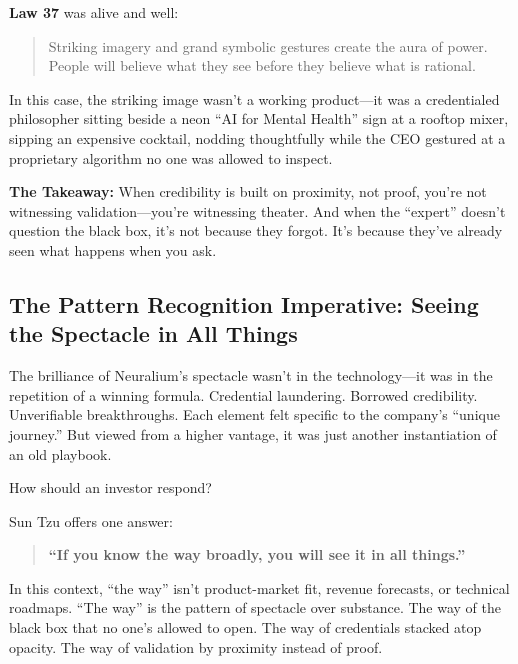 \medskip

\textbf{Law 37} was alive and well:

\begin{quote}
Striking imagery and grand symbolic gestures create the aura of power. People will believe what they see before they believe what is rational.
\end{quote}

In this case, the striking image wasn’t a working product—it was a credentialed philosopher sitting beside a neon ``AI for Mental Health'' sign at a rooftop mixer, sipping an expensive cocktail, nodding thoughtfully while the CEO gestured at a proprietary algorithm no one was allowed to inspect.

\medskip

\textbf{The Takeaway:}  
When credibility is built on proximity, not proof, you’re not witnessing validation—you’re witnessing theater.  
And when the ``expert'' doesn’t question the black box, it’s not because they forgot.  
It’s because they’ve already seen what happens when you ask.


\subsection{The Pattern Recognition Imperative: Seeing the Spectacle in All Things}

The brilliance of Neuralium’s spectacle wasn’t in the technology—it was in the repetition of a winning formula. Credential laundering. Borrowed credibility. Unverifiable breakthroughs.  
Each element felt specific to the company’s “unique journey.” But viewed from a higher vantage, it was just another instantiation of an old playbook.

How should an investor respond?

Sun Tzu offers one answer:

\begin{quote}
\textbf{“If you know the way broadly, you will see it in all things.”}
\end{quote}

In this context, “the way” isn’t product-market fit, revenue forecasts, or technical roadmaps.  
“The way” is the pattern of spectacle over substance.  
The way of the black box that no one’s allowed to open.  
The way of credentials stacked atop opacity.  
The way of validation by proximity instead of proof.

\medskip

